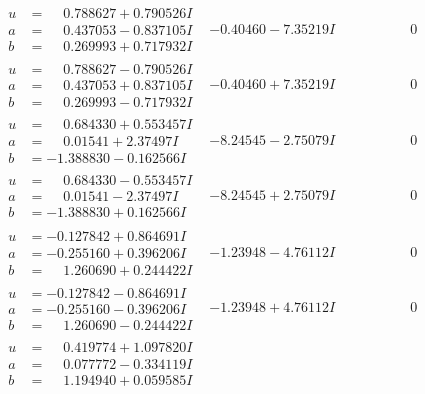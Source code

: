 \documentclass[1p]{elsarticle_modified}
\theoremstyle{definition}
\begin{document}
$$\begin{array}{c|c|c}
\begin{aligned}
u &= \phantom{-}0.788627 + 0.790526 I \\
a &= \phantom{-}0.437053 - 0.837105 I \\
b &= \phantom{-}0.269993 + 0.717932 I\end{aligned}
 & -0.40460 - 7.35219 I & \phantom{-0.000000 } 0 \\ \hline\begin{aligned}
u &= \phantom{-}0.788627 - 0.790526 I \\
a &= \phantom{-}0.437053 + 0.837105 I \\
b &= \phantom{-}0.269993 - 0.717932 I\end{aligned}
 & -0.40460 + 7.35219 I & \phantom{-0.000000 } 0 \\ \hline\begin{aligned}
u &= \phantom{-}0.684330 + 0.553457 I \\
a &= \phantom{-}0.01541 + 2.37497 I \\
b &= -1.388830 - 0.162566 I\end{aligned}
 & -8.24545 - 2.75079 I & \phantom{-0.000000 } 0 \\ \hline\begin{aligned}
u &= \phantom{-}0.684330 - 0.553457 I \\
a &= \phantom{-}0.01541 - 2.37497 I \\
b &= -1.388830 + 0.162566 I\end{aligned}
 & -8.24545 + 2.75079 I & \phantom{-0.000000 } 0 \\ \hline\begin{aligned}
u &= -0.127842 + 0.864691 I \\
a &= -0.255160 + 0.396206 I \\
b &= \phantom{-}1.260690 + 0.244422 I\end{aligned}
 & -1.23948 - 4.76112 I & \phantom{-0.000000 } 0 \\ \hline\begin{aligned}
u &= -0.127842 - 0.864691 I \\
a &= -0.255160 - 0.396206 I \\
b &= \phantom{-}1.260690 - 0.244422 I\end{aligned}
 & -1.23948 + 4.76112 I & \phantom{-0.000000 } 0 \\ \hline\begin{aligned}
u &= \phantom{-}0.419774 + 1.097820 I \\
a &= \phantom{-}0.077772 - 0.334119 I \\
b &= \phantom{-}1.194940 + 0.059585 I\end{aligned}

\end{array}$$
\end{document}
